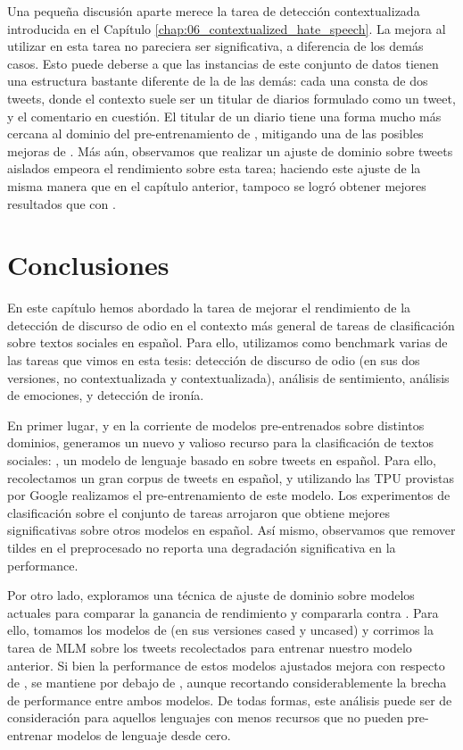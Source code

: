 Una pequeña discusión aparte merece la tarea de detección contextualizada introducida en el Capítulo \ref{chap:06_contextualized_hate_speech}. La mejora al utilizar \robertuito{} en esta tarea no pareciera ser significativa, a diferencia de los demás casos. Esto puede deberse a que las instancias de este conjunto de datos tienen una estructura bastante diferente de la de las demás: cada una consta de dos tweets, donde el contexto suele ser un titular de diarios formulado como un tweet, y el comentario en cuestión. El titular de un diario tiene una forma mucho más cercana al dominio del pre-entrenamiento de \beto{}, mitigando una de las posibles mejoras de \robertuito{}. Más aún, observamos que realizar un ajuste de dominio sobre tweets aislados empeora el rendimiento sobre esta tarea; haciendo este ajuste de la misma manera que en el capítulo anterior, tampoco se logró obtener mejores resultados que con \beto{}.


\section{Conclusiones}

En este capítulo hemos abordado la tarea de mejorar el rendimiento de la detección de discurso de odio en el contexto más general de tareas de clasificación sobre textos sociales en español. Para ello, utilizamos como benchmark varias de las tareas que vimos en esta tesis: detección de discurso de odio (en sus dos versiones, no contextualizada y contextualizada), análisis de sentimiento, análisis de emociones, y detección de ironía.

En primer lugar, y en la corriente de modelos pre-entrenados sobre distintos dominios, generamos un nuevo y valioso recurso para la clasificación de textos sociales: \robertuito{}, un modelo de lenguaje basado en \roberta{} sobre tweets en español. Para ello, recolectamos un gran corpus de tweets en español, y utilizando las TPU provistas por Google realizamos el pre-entrenamiento de este modelo. Los experimentos de clasificación sobre el conjunto de tareas arrojaron que \robertuito{} obtiene mejores significativas sobre otros modelos en español. Así mismo, observamos que remover tildes en el preprocesado no reporta una degradación significativa en la performance.

Por otro lado, exploramos una técnica de ajuste de dominio sobre modelos actuales para comparar la ganancia de rendimiento y compararla contra \robertuito{}. Para ello, tomamos los modelos de \beto{} (en sus versiones cased y uncased) y corrimos la tarea de MLM sobre los tweets recolectados para entrenar nuestro modelo anterior. Si bien la performance de estos modelos ajustados mejora con respecto de \beto{}, se mantiene por debajo de \robertuito{}, aunque recortando considerablemente la brecha de performance entre ambos modelos. De todas formas, este análisis puede ser de consideración para aquellos lenguajes con menos recursos que no pueden pre-entrenar modelos de lenguaje desde cero.

